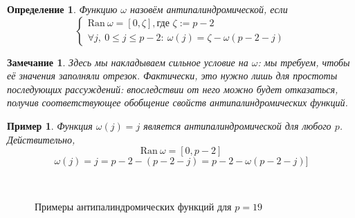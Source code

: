 \documentclass[14pt, a4paper, russian]{report}
\newtheorem{remark}{\indent Замечание}
\newtheorem{definition}{\indent Определение}
\newtheorem*{example}{\indent Пример}
\begin{document}
\begin{definition}\label{antipalindromic}
Функцию $\omega$ назовём \emph{антипалиндромической}, если
\[\begin{cases}
	\mathrm{Ran }\ \omega = \left[0, \zeta\right], \text{где } \zeta := p-2 \\
	\forall j,\ 0 \le j \le p-2: \  \omega(j) = \zeta - \omega(p-2-j)
\end{cases}\]
\end{definition}
\begin{remark}
Здесь мы накладываем сильное условие на $\omega$: мы требуем, чтобы её значения заполняли отрезок. Фактически, это нужно лишь для простоты последующих рассуждений: впоследствии от него можно будет отказаться, получив соответствующее обобщение свойств антипалиндромических функций.
\end{remark}


\begin{example} \label{classic_omega}
Функция $\omega(j)=j$ является антипалиндромической для любого $p$. Действительно,
$$
\mathrm{Ran }\ \omega = \left[0, p-2\right]
$$
$$
\omega(j) = j = p-2 - (p-2-j) = p-2 - \omega(p-2-j)]
$$
\end{example}

\begin{figure}[!h]
    \\
    \caption{\small Примеры антипалиндромических функций для $p=19$}
\label{fig:antipalindromic}
\end{figure}
\end{document}
